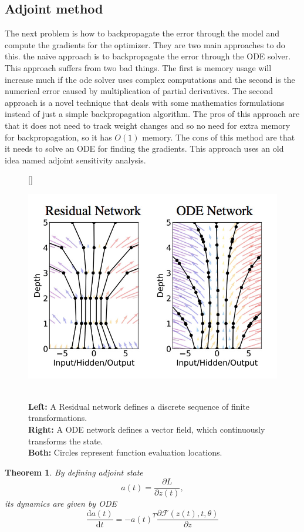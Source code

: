 \documentclass{article}
\newtheorem{theorem}{Theorem}
\begin{document}
	\subsection{Adjoint method}
	The next problem is how to backpropagate the error through the model and compute the gradients for the optimizer. They are two main approaches to do this. the naive approach is to backpropagate the error through the ODE solver. This approach suffers from two bad things. The first is memory usage will increase much if the ode solver uses complex computations and the second is the numerical error caused by multiplication of partial derivatives. The second approach is a novel technique that deals with some mathematics formulations instead of just a simple backpropagation algorithm. The pros of this approach are that it does not need to track weight changes and so no need for extra memory for backpropagation, so it has $O(1)$ memory. The cons of this method are that it needs to solve an ODE for finding the gradients. This approach uses an old idea named adjoint sensitivity analysis.	
	\\
	\begin{figure}[t]
		\centering
		[\FBwidth]
		{\caption{\\\textbf{Left:} A Residual network defines a discrete sequence of finite transformations.\\
				\textbf{Right:} A ODE network defines a vector field, which continuously transforms the state. \\
				\textbf{Both:} Circles represent function evaluation locations.}\label{fig:node}}
		{\includegraphics[width=.65\textwidth]{images/node}}
		
	\end{figure}
	\begin{theorem}
		By defining adjoint state 
		\begin{equation*}
		a(t) = \frac{\partial L}{\partial z(t)},
		\end{equation*}
		its dynamics are given by ODE
		\begin{equation}
		\frac{\text{d}a(t)}{\text{d}t} = - a(t)^T \frac{\partial \mathcal{F}(z(t),t,\theta)}{\partial z}
		\label{eq:adj}
		\end{equation}
	\end{theorem}
\end{document}
